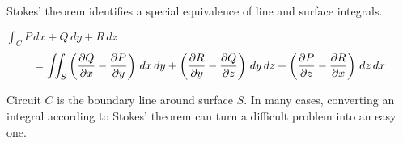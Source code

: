 
\newpage

\noindent
Stokes' theorem identifies a special equivalence of line and surface
integrals.

\bigskip
\noindent
$\displaystyle{\int_C P\,dx+Q\,dy+R\,dz}$
$$=
\int\!\!\!\int_S
\left({\partial Q\over\partial x}-{\partial P\over\partial y}\right)\,dx\,dy
+
\left({\partial R\over\partial y}-{\partial Q\over\partial z}\right)\,dy\,dz
+
\left({\partial P\over\partial z}-{\partial R\over\partial x}\right)\,dz\,dx
$$

\noindent
Circuit $C$ is the boundary line around surface $S$.
In many cases, converting an integral according to
Stokes' theorem can turn a difficult problem into an easy one.

